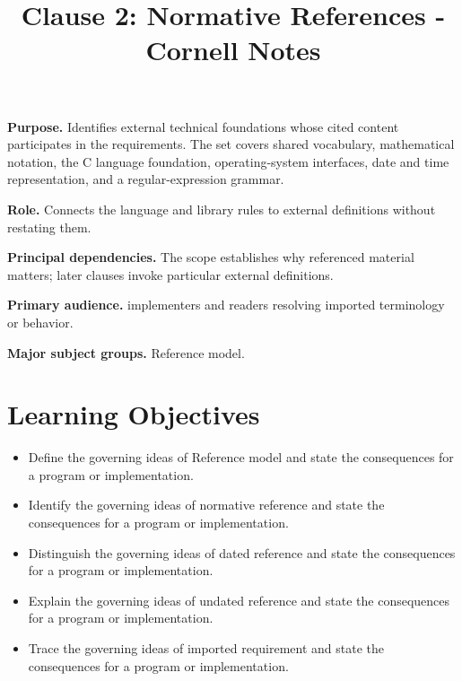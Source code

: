 \documentclass[11pt,letterpaper]{article}
\title{Clause 2: Normative References - Cornell Notes}
\author{}
\date{}
\begin{document}
\maketitle
\begin{CornellReferenceOrientationBox}
\textbf{Purpose.} Identifies external technical foundations whose cited content participates in the requirements. The set covers shared vocabulary, mathematical notation, the C language foundation, operating-system interfaces, date and time representation, and a regular-expression grammar.
\par\textbf{Role.} Connects the language and library rules to external definitions without restating them.
\par\textbf{Principal dependencies.} The scope establishes why referenced material matters; later clauses invoke particular external definitions.
\par\textbf{Primary audience.} implementers and readers resolving imported terminology or behavior.
\par\textbf{Major subject groups.} Reference model.
\end{CornellReferenceOrientationBox}
\section{Learning Objectives}
\begin{itemize}[label=\textcolor{CornellReferenceTeal}{$\blacktriangleright$}]
\item Define the governing ideas of Reference model and state the consequences for a program or implementation.
\item Identify the governing ideas of normative reference and state the consequences for a program or implementation.
\item Distinguish the governing ideas of dated reference and state the consequences for a program or implementation.
\item Explain the governing ideas of undated reference and state the consequences for a program or implementation.
\item Trace the governing ideas of imported requirement and state the consequences for a program or implementation.
\end{itemize}
\end{document}
